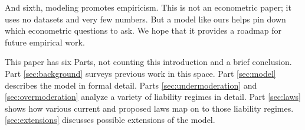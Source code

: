 And sixth, modeling promotes empiricism. This is not an econometric paper; it uses no datasets and very few numbers. But a model like ours helps pin down which econometric questions to ask. We hope that it provides a roadmap for future empirical work.

This paper has six Parts, not counting this introduction and a brief conclusion. Part \ref{sec:background} surveys  previous work in this space. Part \ref{sec:model} describes the model in formal detail. Parts \ref{sec:undermoderation} and \ref{sec:overmoderation} analyze a variety of liability regimes in detail.  Part \ref{sec:laws} shows how various current and proposed laws map on to those liability regimes.  \autoref{sec:extensions} discusses possible extensions of the model.